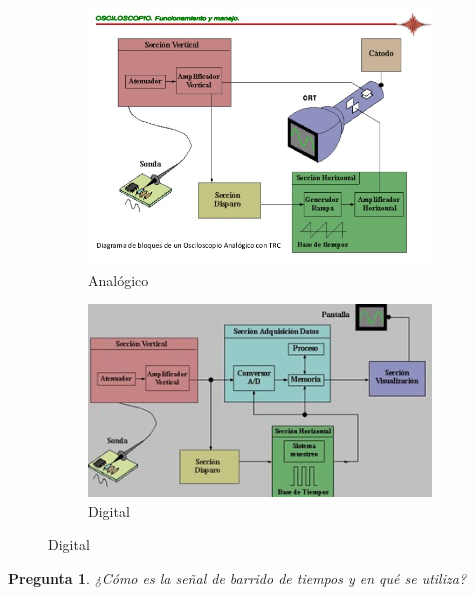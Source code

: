 \documentclass[a4paper,12pt]{article}
\newtheorem{preg}{Pregunta} %
\begin{document}
\begin{figure}[H]
     \centering
     \begin{subfigure}[b]{0.7\textwidth}
         \centering
         \includegraphics[width=\textwidth]{bloque_analogico.jpg}
         \caption{Analógico}
     \end{subfigure}
     \hfill
     \begin{subfigure}[b]{0.6\textwidth}
         \centering
         \includegraphics[width=\textwidth]{bloque_digital.jpg}
         \caption{Digital}
     \end{subfigure}
\end{figure}



\begin{preg}
¿Cómo es la señal de barrido de tiempos y en qué se utiliza?
\end{preg}
\end{document}
